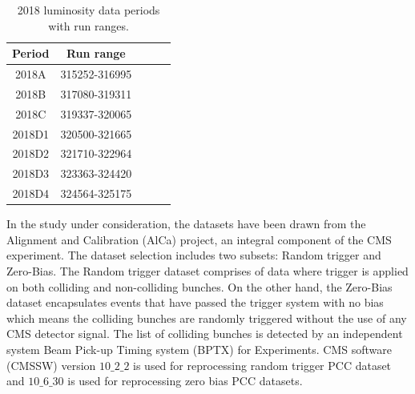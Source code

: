 \begin{table}
  \begin{center}
    \caption[Run ranges for 2022 periods]{2018 luminosity data periods with run ranges.}
    \begin{tabular}{ccccc}
    \textbf{Period}   & \textbf{Run range} \\ \hline
     2018A      &        315252-316995         \\
     2018B      &        317080-319311         \\
     2018C      &        319337-320065         \\
     2018D1     &        320500-321665        \\
     2018D2     &        321710-322964         \\
     2018D3     &        323363-324420         \\
     2018D4     &        324564-325175        \\
      \end{tabular}
    \label{tab:period_run_ranges}
  \end{center}
\end{table}

In the study under consideration, the datasets have been drawn from the Alignment and Calibration (AlCa) project, an integral component of the CMS experiment. The dataset selection includes two subsets: Random trigger and Zero-Bias. The Random trigger dataset comprises of data where trigger is applied on both colliding and non-colliding bunches. On the other hand, the Zero-Bias dataset encapsulates events that have passed the trigger system with no bias which means the colliding bunches are randomly triggered without the use of any CMS detector signal. The list of colliding bunches is detected by an independent system Beam Pick-up Timing system (BPTX) for Experiments. CMS software (CMSSW) version $10{\_}2{\_}2$ is used for reprocessing random trigger PCC dataset and $10{\_}6{\_}30$  \cite{CMSReleaseNotes} is used for reprocessing zero bias PCC datasets.

